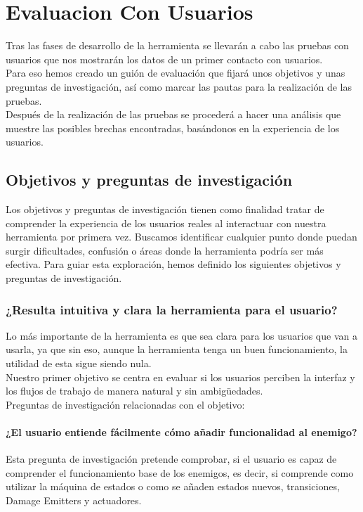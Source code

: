 \setcounter{secnumdepth}{3} %
\chapter{Evaluacion Con Usuarios}
\label{cap:evaluacionConUsuarios}
Tras las fases de desarrollo de la herramienta se llevarán a cabo las pruebas con usuarios que nos mostrarán los datos de un primer contacto con usuarios.\\
Para eso hemos creado un guión de evaluación que fijará unos objetivos y unas preguntas de investigación, así como marcar las pautas para la realización de las pruebas. \\
Después de la realización de las pruebas se procederá a hacer una análisis que muestre las posibles brechas encontradas, basándonos en la experiencia de los usuarios. \\

\section{Objetivos y preguntas de investigación} \label{sec:preguntas}
Los objetivos y preguntas de investigación tienen como finalidad tratar de comprender la experiencia de los usuarios reales al interactuar con nuestra herramienta por primera vez. Buscamos identificar cualquier punto donde puedan surgir dificultades, confusión o áreas donde la herramienta podría ser más efectiva. Para guiar esta exploración, hemos definido los siguientes objetivos y preguntas de investigación.

\subsection{¿Resulta intuitiva y clara la herramienta para el usuario?} \label{sec:intuitiva}
Lo más importante de la herramienta es que sea clara para los usuarios que van a usarla, ya que sin eso, aunque la herramienta tenga un buen funcionamiento, la utilidad de esta sigue siendo nula.\\
Nuestro primer objetivo se centra en evaluar si los usuarios perciben la interfaz y los flujos de trabajo de manera natural y sin ambigüedades.\\

Preguntas de investigación relacionadas con el objetivo:
\subsubsection{¿El usuario entiende fácilmente cómo añadir funcionalidad al enemigo?}
Esta pregunta de investigación pretende comprobar, si el usuario es capaz de comprender el funcionamiento base de los enemigos, es decir, si comprende como utilizar la máquina de estados o como se añaden estados nuevos, transiciones, Damage Emitters y actuadores.\\

